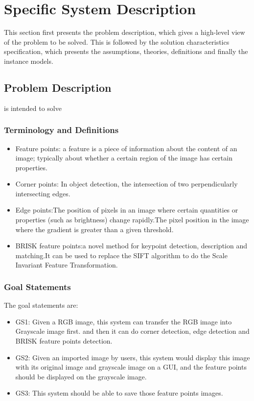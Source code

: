 \documentclass[12pt]{article}
\begin{document}
\section{Specific System Description}

This section first presents the problem description, which gives a high-level
view of the problem to be solved.  This is followed by the solution characteristics
specification, which presents the assumptions, theories, definitions and finally
the instance models. 

\subsection{Problem Description} \label{Sec_pd}

 is intended to solve

\subsubsection{Terminology and  Definitions}

\begin{itemize}
\item Feature points: a feature is a piece of information about the content of an image; typically about whether a certain region of the image has certain properties.
\item Corner points: In object detection, the intersection of two perpendicularly intersecting edges\cite{ZhangY2021}.
\item Edge points:The position of pixels in an image where certain quantities or properties (such as brightness) change rapidly.The pixel position in the image where the gradient is greater than a given threshold\cite{ZhangY2021}.
\item BRISK feature points:a novel method for keypoint detection, description and matching\cite{Leutenegger2011}.It can be used to replace the SIFT algorithm to do the Scale Invariant Feature Transformation.

\end{itemize}

\subsubsection{Goal Statements}


The goal statements are:

\begin{itemize}

\item GS1: Given a RGB image, this system can transfer the RGB image into Grayscale image first. and then it can do corner detection, edge detection and BRISK feature points detection.
\item GS2: Given an imported image by users, this system would display this image with its original image and grayscale image on a GUI, and the feature points should be displayed on the grayscale image.
\item GS3: This system should be able to save those feature points images.

\end{itemize}
\end{document}
